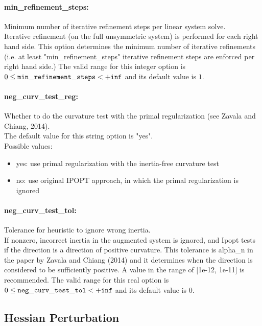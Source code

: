 \paragraph{min\_refinement\_steps:}\label{opt:min_refinement_steps} Minimum number of iterative refinement steps per linear system solve. \\
 Iterative refinement (on the full unsymmetric system) is performed for each right hand side.  This option determines the minimum number of iterative refinements (i.e. at least "min\_refinement\_steps" iterative refinement steps are enforced per right hand side.) The valid range for this integer option is
$0 \le {\tt min\_refinement\_steps } <  {\tt +inf}$
and its default value is $1$.


\paragraph{neg\_curv\_test\_reg:}\label{opt:neg_curv_test_reg} Whether to do the curvature test with the primal regularization (see Zavala and Chiang, 2014). \\
 The default value for this string option is "yes".
\\ 
Possible values:
\begin{itemize}
   \item yes: use primal regularization with the inertia-free curvature test
   \item no: use original IPOPT approach, in which the primal regularization is ignored
\end{itemize}

\paragraph{neg\_curv\_test\_tol:}\label{opt:neg_curv_test_tol} Tolerance for heuristic to ignore wrong inertia. \\
 If nonzero, incorrect inertia in the augmented system is ignored, and Ipopt tests if the direction is a direction of positive curvature.  This tolerance is alpha\_n in the paper by Zavala and Chiang (2014) and it determines when the direction is considered to be sufficiently positive. A value in the range of [1e-12, 1e-11] is recommended. The valid range for this real option is 
$0 \le {\tt neg\_curv\_test\_tol } <  {\tt +inf}$
and its default value is $0$.


\subsection{Hessian Perturbation}

